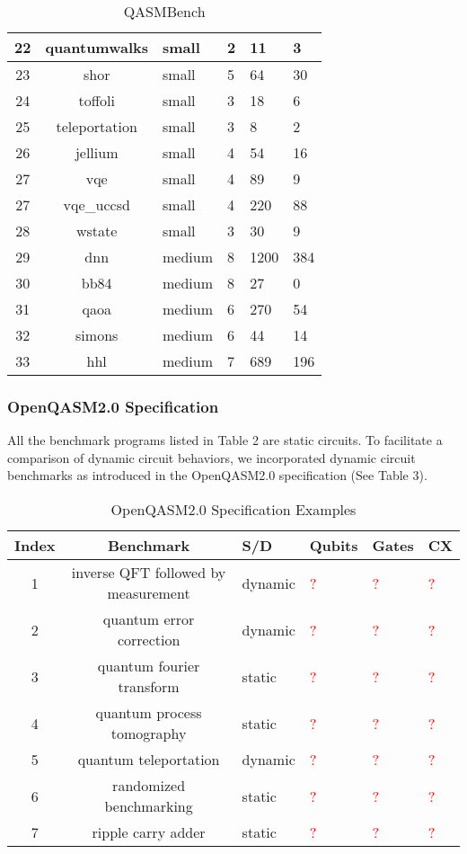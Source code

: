 \documentclass[10pt,a4paper]{article}
\newcommand{\<}{\langle}
\renewcommand{\>}{\rangle}
\newcommand{\red}[1]{\textcolor{red}{#1}}
\newcommand{\todo}{\red{?}}
\begin{document}
\begin{table}[h]
\begin{tabularx}{\textwidth}{|c|c|X|X|X|X|}
\hline
22 & quantumwalks & small & 2 & 11 & 3 \\
\hline
23 & shor & small & 5 & 64 & 30 \\
\hline
24 & toffoli & small & 3 & 18 & 6 \\
\hline
25 & teleportation & small & 3 & 8 & 2 \\
\hline
26 & jellium & small & 4 & 54 & 16 \\
\hline
27 & vqe & small & 4 & 89 & 9 \\
\hline
27 & vqe\_uccsd & small & 4 & 220 & 88 \\
\hline
28 & wstate & small & 3 & 30 & 9 \\
\hline
29 & dnn & medium & 8 & 1200 & 384 \\
\hline
30 & bb84 & medium & 8 & 27 & 0 \\
\hline
31 & qaoa & medium & 6 & 270 & 54 \\
\hline
32 & simons & medium & 6 & 44 & 14 \\
\hline
33 & hhl & medium & 7 & 689 & 196 \\
\hline
\end{tabularx}
\caption{QASMBench}
\label{table:qbenchmarks}
\end{table}

\subsubsection{OpenQASM2.0 Specification}

All the benchmark programs listed in Table 2 are static circuits. To facilitate a comparison
of dynamic circuit behaviors, we incorporated dynamic circuit benchmarks as introduced in the
OpenQASM2.0 specification (See Table 3).

\begin{table}[h]
\centering
\begin{tabularx}{\textwidth}{|c|c|X|X|X|X|}
\hline
\textbf{Index} & \textbf{Benchmark} & \textbf{S/D} & \textbf{Qubits} & \textbf{Gates} & \textbf{CX} \\
\hline
1 & inverse QFT followed by measurement & dynamic & \todo & \todo & \todo \\
\hline
2 & quantum error correction & dynamic & \todo & \todo & \todo \\
\hline
3 & quantum fourier transform & static & \todo & \todo & \todo \\
\hline
4 & quantum process tomography & static & \todo & \todo & \todo \\
\hline
5 & quantum teleportation & dynamic & \todo & \todo & \todo \\
\hline
6 & randomized benchmarking & static & \todo & \todo & \todo \\
\hline
7 & ripple carry adder & static & \todo & \todo & \todo \\
\hline
\end{tabularx}
\caption{OpenQASM2.0 Specification Examples}
\label{table:qbenchmarks}
\end{table}
\end{document}
